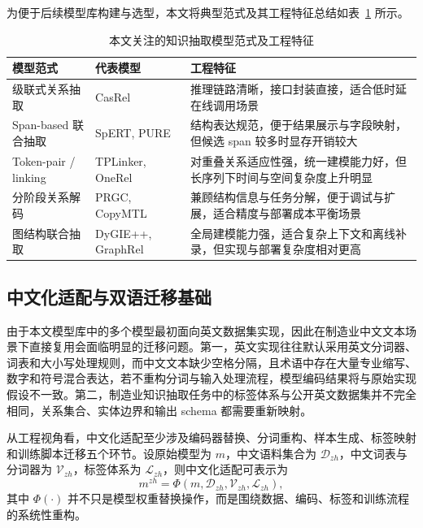 为便于后续模型库构建与选型，本文将典型范式及其工程特征总结如表~\ref{tab:foundation_models_compact} 所示。
\begin{table}[htbp]
  \centering
  \caption{本文关注的知识抽取模型范式及工程特征}
  \vspace{0.5em}\wuhao
  \begin{tabularx}{\textwidth}{l l X}
    \toprule
    模型范式 & 代表模型 & 工程特征 \\
    \midrule
    级联式关系抽取 & CasRel & 推理链路清晰，接口封装直接，适合低时延在线调用场景 \\
    Span-based 联合抽取 & SpERT, PURE & 结构表达规范，便于结果展示与字段映射，但候选 span 较多时显存开销较大 \\
    Token-pair / linking & TPLinker, OneRel & 对重叠关系适应性强，统一建模能力好，但长序列下时间与空间复杂度上升明显 \\
    分阶段关系解码 & PRGC, CopyMTL & 兼顾结构信息与任务分解，便于调试与扩展，适合精度与部署成本平衡场景 \\
    图结构联合抽取 & DyGIE++, GraphRel & 全局建模能力强，适合复杂上下文和离线补录，但实现与部署复杂度相对更高 \\
    \bottomrule
  \end{tabularx}
  \label{tab:foundation_models_compact}
\end{table}

\subsection{中文化适配与双语迁移基础}
由于本文模型库中的多个模型最初面向英文数据集实现，因此在制造业中文文本场景下直接复用会面临明显的迁移问题。第一，英文实现往往默认采用英文分词器、词表和大小写处理规则，而中文文本缺少空格分隔，且术语中存在大量专业缩写、数字和符号混合表达，若不重构分词与输入处理流程，模型编码结果将与原始实现假设不一致。第二，制造业知识抽取任务中的标签体系与公开英文数据集并不完全相同，关系集合、实体边界和输出 schema 都需要重新映射。

从工程视角看，中文化适配至少涉及编码器替换、分词重构、样本生成、标签映射和训练脚本迁移五个环节。设原始模型为 $m$，中文语料集合为 $\mathcal{D}_{zh}$，中文词表与分词器为 $\mathcal{V}_{zh}$，标签体系为 $\mathcal{L}_{zh}$，则中文化适配可表示为
\begin{equation}
m^{zh}=\Phi(m,\mathcal{D}_{zh},\mathcal{V}_{zh},\mathcal{L}_{zh}),
\end{equation}
其中 $\Phi(\cdot)$ 并不只是模型权重替换操作，而是围绕数据、编码、标签和训练流程的系统性重构。

